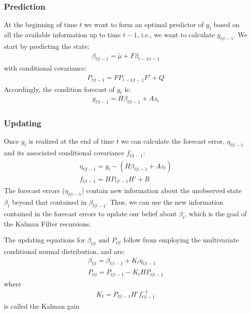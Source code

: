 \documentclass[10pt]{article}
\begin{document}
\subsubsection{Prediction}
At the beginning of time $t $ we want to form an optimal predictor of $y_t $ based on all the available information up to time $t -  1 $, i.e., we want to calculate $y_{t|t - 1} $. We start by predicting the state: 
\begin{gather*}
    \beta_{t|t - 1} = \tilde{\mu} + F\beta_{t- 1|t - 1}
\end{gather*}
with conditional covariance:
\begin{gather*}
    P_{t|t - 1} = FP_{t - 1|t - 1}F' + Q
\end{gather*}
Accordingly, the condition forecast of $y_t $ is:
\begin{gather*}
    y_{t|t - 1} = H\beta_{t|t - 1} + Az_t 
\end{gather*}
\subsubsection{Updating}
Once $y_t $ is realized at the end of time $t $ we can calculate the forecast error, $\eta_{t|t - 1} $ and its associated conditional covariance $f_{t|t - 1} $: 
\begin{gather*}
    \eta_{t|t - 1} = y_t - (H\beta_{t|t - 1} + Az_t) \\
    f_{t|t - 1} = HP_{t|t - 1}H' + R
\end{gather*}
The forecast errors ($\eta_{t|t - 1} $) contain new information about the unobserved state $\beta_t $ beyond that contained in $\beta_{t|t - 1} $. Thus, we can use the new information contained in the forecast errors to update our belief about $\beta_t $, which is the goal of the Kalman Filter recursions.

The updating equations for $\beta_{t|t}\text{ and }P_{t|t} $ follow from employing the multivariate conditional normal distribution, and are: 
\begin{gather*}
    \beta_{t|t} = \beta_{t|t - 1} + K_t\eta_{t|t - 1}\\
    P_{t|t} = P_{t|t - 1} - K_tHP_{t|t - 1}
\end{gather*}
where 
\begin{gather}
    K_t = P_{t|t - 1}H'f_{t|t - 1}^{-1}
\end{gather}
is called the Kalman gain
\newpage 
\end{document}
